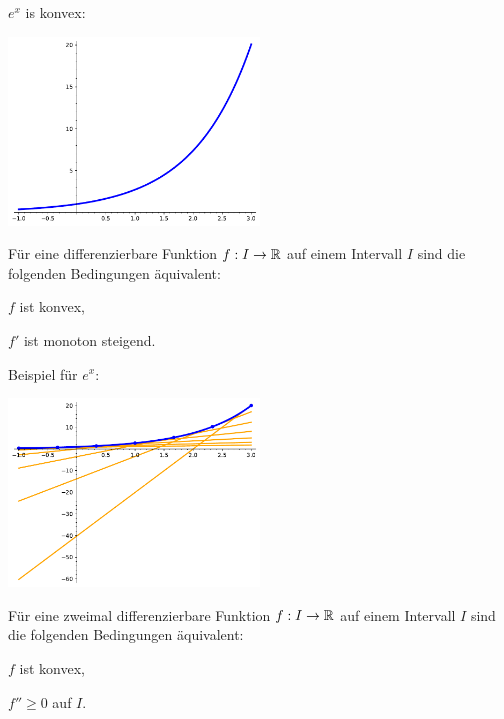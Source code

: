 \begin{bsp}
	$e^x$ is konvex: 
		\begin{center}
		\includegraphics[width=0.5\textwidth]{pics/konvex.pdf}
		\end{center} 
\end{bsp} 

\begin{thm} Für eine differenzierbare Funktion $f : I \to \mathbb{R}$  auf einem Intervall $I$ sind die folgenden Bedingungen äquivalent: 
	\begin{enumi}
		\item $f$ ist konvex,
		\item $f'$ ist monoton steigend. 
	\end{enumi}
\end{thm} 

\begin{bsp}
	Beispiel für $e^x$: 
\begin{center}
	\includegraphics[width=0.5\textwidth]{pics/konvex_1.pdf}
\end{center} 
	
\end{bsp} 

\begin{thm} Für eine zweimal differenzierbare Funktion $f : I \to \mathbb{R}$ auf einem Intervall $I$ sind die folgenden Bedingungen äquivalent: 
	\begin{enumi} 
		\item $f$ ist konvex, 
		\item $f'' \ge 0$ auf $I$.
	\end{enumi} 
\end{thm} 



